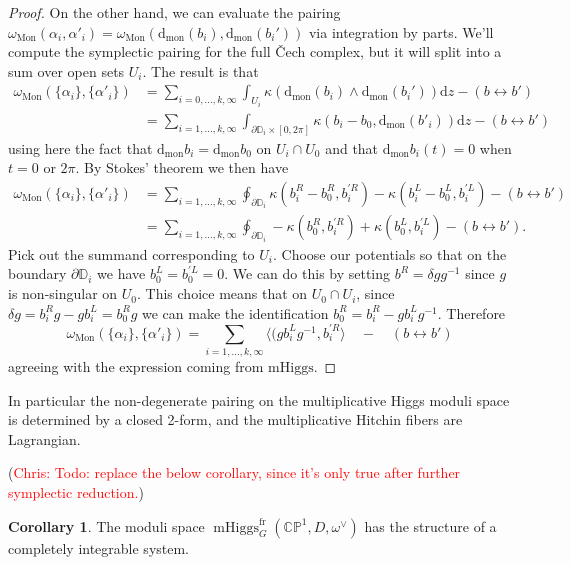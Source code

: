 \documentclass[11pt, oneside, reqno]{amsart}
\theoremstyle{definition} \newtheorem{definition}{Definition}[section]
\newtheorem{corollary}[definition]{Corollary}
\theoremstyle{definition} \newtheorem{remark}[definition]{Remark}
\theoremstyle{definition} \newtheorem{remarks}[definition]{Remarks}
\theoremstyle{definition} \newtheorem{question}[definition]{Question}
\theoremstyle{definition} \newtheorem*{note}{Note}
\theoremstyle{definition} \newtheorem{example}[definition]{Example}
\theoremstyle{definition} \newtheorem{examples}[definition]{Examples}
\newcommand{\bb}[1]{\mathbb{#1}}
\newcommand{\mr}[1]{\mathrm{#1}}
\newcommand{\dd}{\partial}
\DeclareMathOperator{\mhiggs}{mHiggs}
\renewcommand{\d}{\mathrm{d}}
\newcommand{\fr}{\mathrm{fr}}
\newcommand{\chris}[1]{(\textcolor{red}{Chris: #1})}
\begin{document}
\begin{proof}
On the other hand, we can evaluate the pairing $\omega_{\mr{Mon}}(\alpha_i,\alpha'_i) = \omega_{\mr{Mon}}(\d_{\mr{mon}}(b_i),\d_{\mr{mon}}(b_i'))$ via integration by parts. We'll compute the symplectic pairing for the full \v Cech complex, but it will split into a sum over open sets $U_i$.  The result is that 
\begin{align*}
\omega_{\mr{Mon}}(\{\alpha_i\},\{\alpha'_i\}) &= \sum_{i=0,\ldots,k,\infty} \int_{U_i} \kappa(\d_{\mr{mon}}(b_i) \wedge \d_{\mr{mon}}(b_i')) \d z - (b \leftrightarrow b')\\
&= \sum_{i=1,\ldots,k,\infty} \int_{\dd \bb D_i \times [0,2\pi]} \kappa(b_i - b_0, \d_{\mr{mon}}(b'_i)) \d z - (b \leftrightarrow b')
\end{align*}
using here the fact that $\d_{\mr{mon}}b_i = \d_{\mr{mon}} b_0$ on $U_i \cap U_0$ and that $\d_{\mr{mon}} b_i(t) = 0$ when $t = 0$ or $2\pi$.  By Stokes' theorem we then have
\begin{align*}
 \omega_{\mr{Mon}}(\{\alpha_i\},\{\alpha'_i\})&= \sum_{i=1,\ldots,k,\infty} \oint_{\dd \bb D_i} \kappa(b_i^R - b_0^R, b_i^{'R}) - \kappa(b_i^L - b_0^L, b_i^{'L}) - (b \leftrightarrow b') \\
 &= \sum_{i=1,\ldots,k,\infty} \oint_{\dd \bb D_i} - \kappa(b_0^R, b_i^{'R}) + \kappa(b_0^L, b_i^{'L}) - (b \leftrightarrow b').
\end{align*}
Pick out the summand corresponding to $U_i$.  Choose our potentials so that on the boundary $\dd \bb D_i$ we have $b_0^L = b_0^{'L} = 0$.  We can do this by setting $b^{R} = \delta g g^{-1}$ since $g$ is non-singular on $U_0$.  This choice means that on $U_0 \cap U_i$, since $\delta g  = b_{i} ^R g - g b_i^L = b_0^{R} g $ we can make the identification $ b_0^{R} = b_{i}^{R} - g b_{i}^{L} g^{-1}$.  Therefore
\[\omega_{\mr{Mon}}(\{\alpha_i\},\{\alpha'_i\}) = \sum_{i=1,\ldots,k,\infty} \langle(g b_i^{L} g^{-1}, b_i^{'R}\rangle \quad - \quad  (b \leftrightarrow b')\]
agreeing with the expression coming from $\mr{mHiggs}$. 
\end{proof}

In particular the non-degenerate pairing on the multiplicative Higgs moduli space is determined by a closed 2-form, and the multiplicative Hitchin fibers are Lagrangian.

\chris{Todo: replace the below corollary, since it's only true after further symplectic reduction.}
\begin{corollary}
The moduli space $\mhiggs^\fr_G(\bb{CP}^1,D,\omega^\vee)$ has the structure of a completely integrable system.
\end{corollary}
\end{document}
